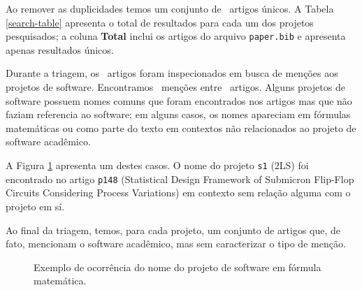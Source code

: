 Ao remover as duplicidades temos um conjunto de \SearchUniqueCount \ artigos
únicos.  A Tabela \ref{search-table} apresenta o total de resultados para cada
um dos projetos pesquisados; a coluna {\bf Total} inclui os artigos do arquivo
\texttt{paper.bib} e apresenta apenas resultados únicos.




Durante a triagem, 
os \SearchUniqueCount \ artigos foram inspecionados em busca de menções aos
projetos de software. Encontramos \ScreeningCount \ menções entre
\ScreeningUniqueCount \ artigos.
Alguns projetos de software possuem nomes comuns que foram encontrados nos
artigos mas que não faziam referencia ao software; em alguns casos, os nomes
apareciam em fórmulas matemáticas ou como parte do texto em contextos não
relacionados ao projeto de software acadêmico.

A Figura \ref{screenshot-paper-p148-2ls} apresenta um destes casos. O nome do
projeto \texttt{s1} (2LS) foi encontrado no artigo \texttt{p148} (Statistical
Design Framework of Submicron Flip-Flop Circuits Considering Process
Variations) em contexto sem relação alguma com o projeto em sí.

Ao final da triagem, temos, para cada projeto, um conjunto de artigos que, de
fato, mencionam o software acadêmico, mas sem caracterizar o tipo de menção.

\begin{figure}[h]
  \center
  \caption{Exemplo de ocorrência do nome do projeto de software em fórmula matemática.}
  \label{screenshot-paper-p148-2ls}
\end{figure}


